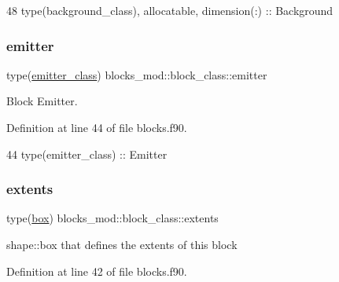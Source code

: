 \begin{DoxyCode}
48         \textcolor{keywordtype}{type}(background\_class), \textcolor{keywordtype}{allocatable}, \textcolor{keywordtype}{dimension(:)} :: Background
\end{DoxyCode}
\mbox{\label{structblocks__mod_1_1block__class_a55e85183ba871abcaba1c00d5393611f}} 
\subsubsection{\texorpdfstring{emitter}{emitter}}
{\footnotesize\ttfamily type(\mbox{\hyperlink{structemitter__mod_1_1emitter__class}{emitter\+\_\+class}}) blocks\+\_\+mod\+::block\+\_\+class\+::emitter\hspace{0.3cm}{\ttfamily [private]}}



Block Emitter. 



Definition at line 44 of file blocks.\+f90.


\begin{DoxyCode}
44         \textcolor{keywordtype}{type}(emitter\_class)    :: Emitter
\end{DoxyCode}
\mbox{\label{structblocks__mod_1_1block__class_aff3b0cb7d8248f8a87691a028de916d3}} 
\subsubsection{\texorpdfstring{extents}{extents}}
{\footnotesize\ttfamily type(\mbox{\hyperlink{structgeometry__mod_1_1box}{box}}) blocks\+\_\+mod\+::block\+\_\+class\+::extents\hspace{0.3cm}{\ttfamily [private]}}



shape\+::box that defines the extents of this block 



Definition at line 42 of file blocks.\+f90.


